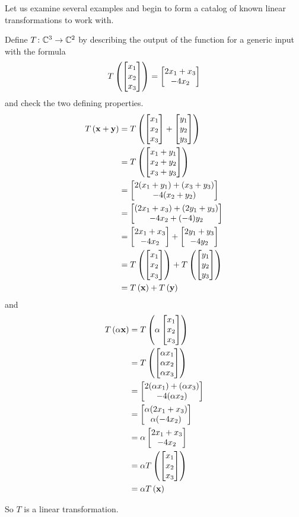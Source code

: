 \documentclass{ximera}
\begin{document}
Let us examine several examples and begin to form a catalog of known linear transformations to work with.

\begin{example}

Define $T\colon \mathbb{C}^{3}\rightarrow\mathbb{C}^{2}$ by describing the output of the function for a generic input with the formula
\[
T\left(\begin{bmatrix}x_1\\x_2\\x_3\end{bmatrix}\right)=\begin{bmatrix}2x_1+x_3\\-4x_2\end{bmatrix}
\]
and check the two defining properties.
\begin{align*}
T\left(\mathbf{x}+\mathbf{y}\right)
&=T\left(\begin{bmatrix}x_1\\x_2\\x_3\end{bmatrix}+\begin{bmatrix}y_1\\y_2\\y_3\end{bmatrix}\right)\\
&=T\left(\begin{bmatrix}x_1+y_1\\x_2+y_2\\x_3+y_3\end{bmatrix}\right)\\
&=\begin{bmatrix}2(x_1+y_1)+(x_3+y_3)\\-4(x_2+y_2)\end{bmatrix}\\
&=\begin{bmatrix}(2x_1+x_3)+(2y_1+y_3)\\-4x_2+(-4)y_2\end{bmatrix}\\
&=\begin{bmatrix}2x_1+x_3\\-4x_2\end{bmatrix}+\begin{bmatrix}2y_1+y_3\\-4y_2\end{bmatrix}\\
&=T\left(\begin{bmatrix}x_1\\x_2\\x_3\end{bmatrix}\right)+T\left(\begin{bmatrix}y_1\\y_2\\y_3\end{bmatrix}\right)\\
&=T\left(\mathbf{x}\right)+T\left(\mathbf{y}\right)
\end{align*}
and
\begin{align*}
T\left(\alpha\mathbf{x}\right)
&=T\left(\alpha\begin{bmatrix}x_1\\x_2\\x_3\end{bmatrix}\right)\\
&=T\left(\begin{bmatrix}\alpha x_1\\\alpha x_2\\\alpha x_3\end{bmatrix}\right)\\
&=\begin{bmatrix}2(\alpha x_1)+(\alpha x_3)\\-4(\alpha x_2)\end{bmatrix}\\
&=\begin{bmatrix}\alpha(2x_1+x_3)\\\alpha(-4x_2)\end{bmatrix}\\
&=\alpha\begin{bmatrix}2x_1+x_3\\-4x_2\end{bmatrix}\\
&=\alpha T\left(\begin{bmatrix}x_1\\x_2\\x_3\end{bmatrix}\right)\\
&=\alpha T\left(\mathbf{x}\right)\\
\end{align*}

So $T$ is a linear transformation.
\end{example}
\end{document}
